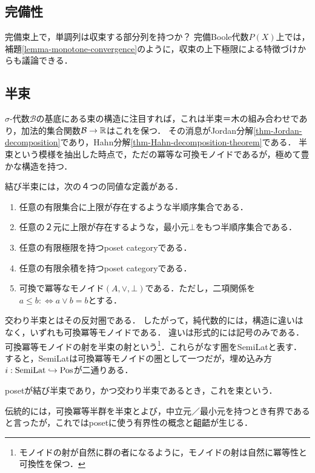 \documentclass[uplatex, dvipdfmx]{jsreport}
\renewcommand{\B}{\mathcal{B}}
\begin{document}
\subsection{完備性}

\begin{tcolorbox}[colframe=ForestGreen, colback=ForestGreen!10!white,breakable,colbacktitle=ForestGreen!40!white,coltitle=black,fonttitle=\bfseries\sffamily,
title=]
    完備束上で，単調列は収束する部分列を持つか？
    完備Boole代数$P(X)$上では，補題\ref{lemma-monotone-convergence}のように，収束の上下極限による特徴づけからも議論できる．
\end{tcolorbox}

\subsection{半束}

\begin{tcolorbox}[colframe=ForestGreen, colback=ForestGreen!10!white,breakable,colbacktitle=ForestGreen!40!white,coltitle=black,fonttitle=\bfseries\sffamily,
title=]
    $\sigma$-代数$\B$の基底にある束の構造に注目すれば，これは半束＝木の組み合わせであり，加法的集合関数$\B\to\R$はこれを保つ．
    その消息がJordan分解\ref{thm-Jordan-decomposition}であり，Hahn分解\ref{thm-Hahn-decomposition-theorem}である．
    半束という模様を抽出した時点で，ただの冪等な可換モノイドであるが，極めて豊かな構造を持つ．
\end{tcolorbox}

\begin{definition}
    結び半束には，次の４つの同値な定義がある．
    \begin{enumerate}
        \item 任意の有限集合に上限が存在するような半順序集合である．
        \item 任意の２元に上限が存在するような，最小元$\bot$をもつ半順序集合である．
        \item 任意の有限極限を持つposet categoryである．
        \item 任意の有限余積を持つposet categoryである．
        \item 可換で冪等なモノイド$(A,\lor,\bot)$である．ただし，二項関係を$a\le b:\Leftrightarrow a\lor b=b$とする．
    \end{enumerate}
    交わり半束とはその反対圏である．
    したがって，純代数的には，構造に違いはなく，いずれも可換冪等モノイドである．
    違いは形式的には記号のみである．可換冪等モノイドの射を半束の射という\footnote{モノイドの射が自然に群の者になるように，モノイドの射は自然に冪等性と可換性を保つ．}．これらがなす圏をSemiLatと表す．
    すると，SemiLatは可換冪等モノイドの圏として一つだが，埋め込み方$i:\mathrm{SemiLat}\hookrightarrow\mathrm{Pos}$が二通りある．

    posetが結び半束であり，かつ交わり半束であるとき，これを束という．
\end{definition}
\begin{remark}
    伝統的には，可換冪等半群を半束とよび，中立元／最小元を持つとき有界であると言ったが，これではposetに使う有界性の概念と齟齬が生じる．
\end{remark}
\end{document}
